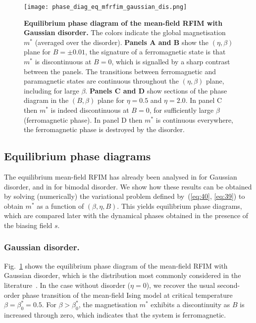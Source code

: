 \documentclass{iopart}
\newcommand{\eqref}[1]{(\ref{#1})}
\begin{document}
\begin{figure}
  \centering
  \texttt{[image: phase\_diag\_eq\_mfrfim\_gaussian\_dis.png]}
  \caption{\textbf{Equilibrium phase diagram of the mean-field RFIM with Gaussian disorder.} 
  The colors indicate the global magnetisation $m^{\ast}$ (averaged over the disorder).
  \textbf{Panels A and B} show the $(\eta, \beta)$ plane for $B=\pm0.01$, the signature of a ferromagnetic state is that $m^{\ast}$ is discontinuous at $B=0$, which is signalled by a sharp contrast between the panels.  The transitions between ferromagnetic and paramagnetic states are continuous throughout the $(\eta,\beta)$ plane, including for large $\beta$.  \textbf{Panels C and D} show sections of the phase diagram in the $(B,\beta)$ plane for $\eta=0.5$ and $\eta=2.0$.  In panel C then $m^{\ast}$ is indeed discontinuous at $B=0$, for sufficiently large $\beta$ (ferromagnetic phase).  In panel D then $m^{\ast}$ is continuous everywhere, the ferromagnetic phase is destroyed by the disorder.}
    \label{fig:1}
\end{figure}



\subsection{Equilibrium phase diagrams}
\label{sec:eq-phase}

The equilibrium mean-field RFIM has already been analysed in \cite{schneider1977random} for Gaussian disorder, and in \cite{luttinger1976exactly, aharony1978tricritical} for bimodal disorder.
We show how these results can be obtained
by solving (numerically) the variational problem defined by~(\ref{eq:40}, \ref{eq:39}) to obtain $m^{\ast}$ as a function of $(\beta,\eta,B)$. 
This yields equilibrium phase diagrams, which are compared later with the dynamical phases obtained in the presence of the biasing field $s$.


\subsubsection{Gaussian disorder.}
\label{sec:eq_gaussian_dis}


Fig.~\ref{fig:1} shows the equilibrium phase diagram of the mean-field RFIM with Gaussian disorder, which is the distribution most commonly considered in the literature~\cite{schneider1977random,krapivsky2010kinetic}. 
In the case without disorder ($\eta=0$), we recover the usual second-order phase transition of the mean-field Ising model at critical temperature {$\beta=\beta^*_0=0.5$}.  For $\beta>\beta^*_0$, the magnetisation $m^{\ast}$ exhibits a discontinuity as $B$ is increased through zero, which indicates that the system is ferromagnetic.  
\end{document}
